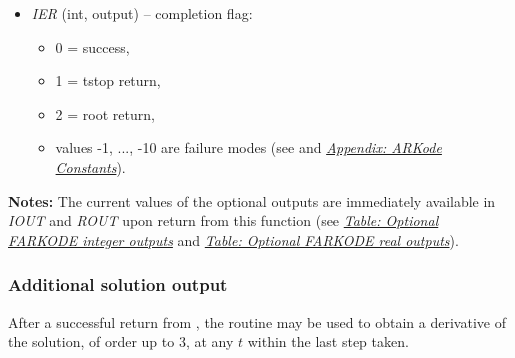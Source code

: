 \documentclass[letterpaper,10pt,english]{sphinxmanual}
\begin{document}
\begin{fulllineitems}
\begin{description}
\begin{itemize}
\begin{itemize}
\end{itemize}

\item {} 
\emph{IER} (int, output) -- completion flag:
\begin{itemize}
\item {} 
0 = success,

\item {} 
1 = tstop return,

\item {} 
2 = root return,

\item {} 
values -1, ..., -10 are failure modes (see {\hyperref[c_interface/User_callable:ARKode]{}} and
{\hyperref[Constants:constants]{\emph{Appendix: ARKode Constants}}}).

\end{itemize}

\end{itemize}

\end{description}

\textbf{Notes:}
The current values of the optional outputs are immediately
available in \emph{IOUT} and \emph{ROUT} upon return from this function (see
{\hyperref[f_interface/Optional_output:finterface-iouttable]{\emph{Table: Optional FARKODE integer outputs}}} and {\hyperref[f_interface/Optional_output:finterface-routtable]{\emph{Table: Optional FARKODE real outputs}}}).

\end{fulllineitems}



\subsubsection{Additional solution output}
\label{f_interface/Usage:finterface-additionaloutput}\label{f_interface/Usage:additional-solution-output}
After a successful return from {\hyperref[f_interface/Usage:f/_/FARKODE]{}}, the routine
{\hyperref[f_interface/Usage:f/_/FARKDKY]{}} may be used to obtain a derivative of the solution,
of order up to 3, at any $t$ within the last step taken.
\end{document}
